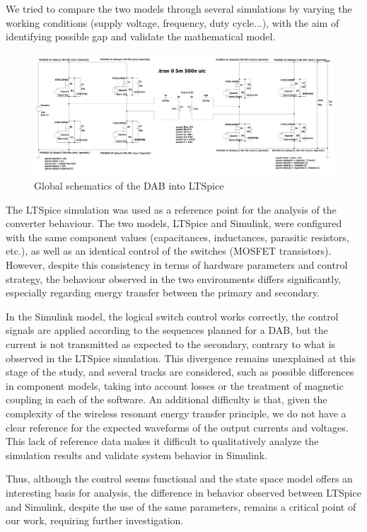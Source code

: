 \documentclass[conference]{IEEEtran}
\begin{document}
We tried to compare the two models through several simulations by varying the
working conditions (supply voltage, frequency, duty cycle...), with the aim of identifying
possible gap and validate the mathematical model.
\begin{figure}[htbp]
	\centerline{\includegraphics[width=\linewidth]{images/12.png}}
	\caption{Global schematics of the DAB into LTSpice}
	\label{fig}
\end{figure}
The LTSpice simulation was used as a reference point for the analysis of the converter
behaviour. The two models, LTSpice and Simulink, were configured with the same
component values (capacitances, inductances, parasitic resistors, etc.), as well as an
identical control of the switches (MOSFET transistors). However, despite this
consistency in terms of hardware parameters and control strategy, the behaviour
observed in the two environments differs significantly, especially regarding energy
transfer between the primary and secondary.

In the Simulink model, the logical switch control works correctly, the control signals
are applied according to the sequences planned for a DAB, but the current is not
transmitted as expected to the secondary, contrary to what is observed in the LTSpice
simulation. This divergence remains unexplained at this stage of the study, and several
tracks are considered, such as possible differences in component models, taking into
account losses or the treatment of magnetic coupling in each of the software.
An additional difficulty is that, given the complexity of the wireless resonant energy
transfer principle, we do not have a clear reference for the expected waveforms of the
output currents and voltages. This lack of reference data makes it difficult to qualitatively
analyze the simulation results and validate system behavior in Simulink.

Thus, although the control seems functional and the state space model offers an
interesting basis for analysis, the difference in behavior observed between LTSpice and
Simulink, despite the use of the same parameters, remains a critical point of our work,
requiring further investigation.
\end{document}
